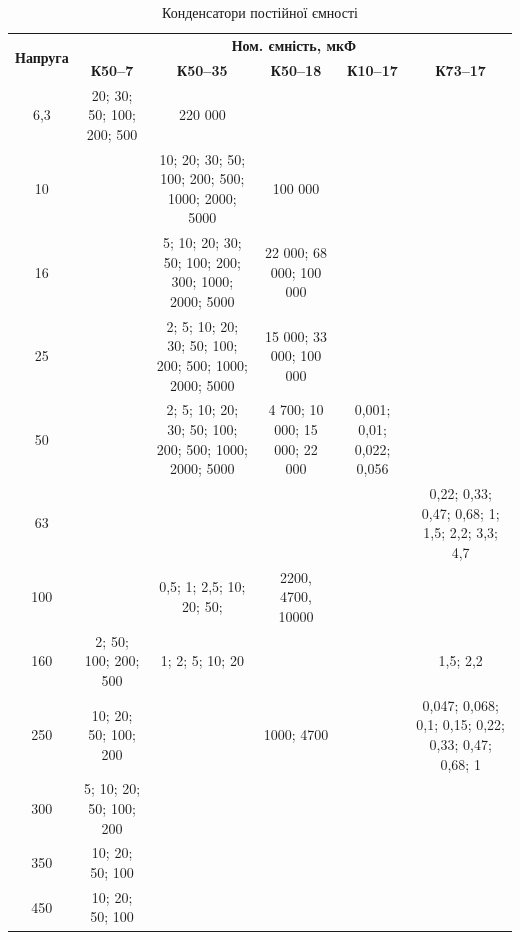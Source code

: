 \documentclass[main.tex]{subfiles}
\begin{document}
\begin{table}[H]
\centering
\caption{Конденсатори постійної ємності}
\label{tab:6.5}
\tiny
\renewcommand{\arraystretch}{1.1}
\begin{tabular}{|c|c|c|c|c|c|}
\hline
\multirow{2}{*}{\textbf{Напруга}} 
& \multicolumn{5}{c|}{\textbf{Ном. ємність, мкФ}} \\ \cline{2-6}
& \textbf{К50--7} 
& \textbf{К50--35} 
& \textbf{К50--18} 
& \textbf{К10--17} 
& \textbf{К73--17} \\ 
\hline
6,3  & 20; 30; 50; 100; 200; 500 
     & 220 000             
     &                   
     &                   
     &                   \\ \hline
10   &                   
     & 10; 20; 30; 50; 100; 200; 500; 1000; 2000; 5000 
     & 100 000             
     &                   
     &                   \\ \hline
16   &                   
     & 5; 10; 20; 30; 50; 100; 200; 300; 1000; 2000; 5000 
     & 22 000; 68 000; 100 000 
     &                   
     &                   \\ \hline
25   &                   
     & 2; 5; 10; 20; 30; 50; 100; 200; 500; 1000; 2000; 5000 
     & 15 000; 33 000; 100 000 
     &                   
     &                   \\ \hline
50   &                   
     & 2; 5; 10; 20; 30; 50; 100; 200; 500; 1000; 2000; 5000 
     & 4 700; 10 000; 15 000; 22 000 
     & 0,001; 0,01; 0,022; 0,056                  
     &                   \\ \hline
63   &                   
     &                   
     & 
     &  
     & 0,22; 0,33; 0,47; 0,68; 1; 1,5; 2,2; 3,3; 4,7 \\ \hline
100  &                  
     & 0,5; 1; 2,5; 10; 20; 50;                  
     & 2200, 4700, 10000
     & 
     & \\ \hline
160  & 2; 50; 100; 200; 500                   
     & 1; 2; 5; 10; 20                   
     &  
     &  
     & 1,5; 2,2            \\ \hline
250  & 10; 20; 50; 100; 200                   
     &                   
     & 1000; 4700
     &                    
     & 0,047; 0,068; 0,1; 0,15; 0,22; 0,33; 0,47; 0,68; 1 \\ \hline
300  & 5; 10; 20; 50; 100; 200                
     &                   
     & 
     &                   
     &                   \\ \hline
350  & 10; 20; 50; 100                   
     &                   
     &  
     &                   
     &                   \\ \hline
450  & 10; 20; 50; 100                   
     &                   
     & 
     &                   
     &                   \\ \hline
\end{tabular}
\normalsize
\end{table}
\end{document}

